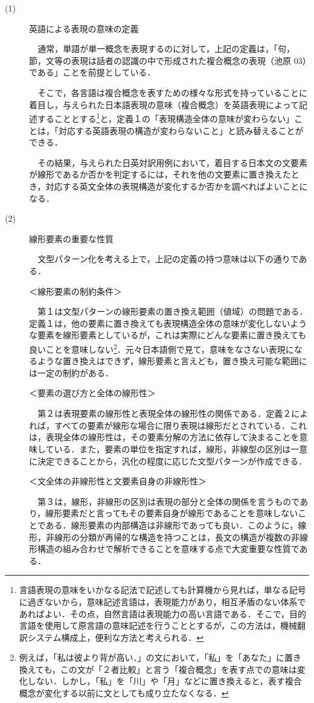 \documentclass{nlp}
\begin{document}
\begin{description}
\item[(1)] 英語による表現の意味の定義 

\verb|  |通常，単語が単一概念を表現するのに対して，上記の定義は，「句，節，文等の表現は話者の認識の中で形成された複合概念の表現（池原 03）である」ことを前提としている．

\verb|  |そこで，各言語は複合概念を表すための様々な形式を持っていることに着目し，与えられた日本語表現の意味（複合概念）を英語表現によって記述することとする\footnote{言語表現の意味をいかなる記法で記述しても計算機から見れば，単なる記号に過ぎないから，意味記述言語は，表現能力があり，相互矛盾のない体系であればよい．その点，自然言語は表現能力の高い言語である．そこで，目的言語を使用して原言語の意味記述を行うこととするが，この方法は，機械翻訳システム構成上，便利な方法と考えられる．}と，定義１の「表現構造全体の意味が変わらない」ことは，「対応する英語表現の構造が変わらないこと」と読み替えることができる．

\verb|  |その結果，与えられた日英対訳用例において，着目する日本文の文要素が線形であるか否かを判定するには，それを他の文要素に置き換えたとき，対応する英文全体の表現構造が変化するか否かを調べればよいことになる．

\item[(2)] 線形要素の重要な性質 

\verb|  |文型パターン化を考える上で，上記の定義の持つ意味は以下の通りである．

＜線形要素の制約条件＞

\verb|  |第１は文型パターンの線形要素の置き換え範囲（値域）の問題である．定義１は，他の要素に置き換えても表現構造全体の意味が変化しないような要素を線形要素としているが，これは実際にどんな要素に置き換えても良いことを意味しない\footnote{例えば，「私は彼より背が高い．」の文において，「私」を「あなた」に置き換えても，この文が「２者比較」と言う「複合概念」を表す点での意味は変化しない．しかし，「私」を「川」や「月」などに置き換えると，表す複合概念が変化する以前に文としても成り立たなくなる．}．元々日本語側で見て，意味をなさない表現になるような置き換えはできず，線形要素と言えども，置き換え可能な範囲には一定の制約がある．

＜要素の選び方と全体の線形性＞

\verb|  |第２は表現要素の線形性と表現全体の線形性の関係である．定義２によれば，すべての要素が線形な場合に限り表現は線形だとされている．これは，表現全体の線形性は，その要素分解の方法に依存して決まることを意味している．また，要素の単位を指定すれば，線形，非線型の区別は一意に決定できることから，汎化の程度に応じた文型パターンが作成できる．

＜文全体の非線形性と文要素自身の非線形性＞

\verb|  |第３は，線形，非線形の区別は表現の部分と全体の関係を言うものであり，線形要素だと言ってもその要素自身が線形であることを意味しないことである．線形要素の内部構造は非線形であっても良い．このように，線形，非線形の分類が再帰的な構造を持つことは，長文の構造が複数の非線形構造の組み合わせで解析できることを意味する点で大変重要な性質である．
\end{description}
\end{document}
